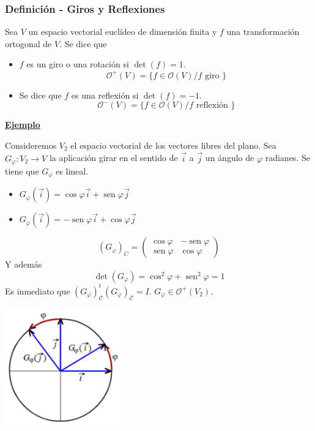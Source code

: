 \documentclass[12pt, a4paper, ones, notitlepage, openany,titlepage]{article}
\newcommand{\ejemplo}{\noindent\underline{\textbf{Ejemplo}}}
\begin{document}
\subsubsection{Definición - Giros y Reflexiones}
Sea $V$ un espacio vectorial euclídeo de dimensión finita y $f$ una transformación ortogonal de $V$. Se dice que
\begin{itemize}
	\item $f$ es un giro o una rotación si $\det(f)=1$.
	$$
	\mathcal{O}^+(V) = \{f \in \mathcal{O}(V) / f \text{ giro }\}
	$$
	\item Se dice que $f$ es una reflexión si $\det(f)=-1$.
	$$
	\mathcal{O}^-(V) = \{f \in \mathcal{O}(V) / f \text{ reflexión }\}
	$$
\end{itemize}

\ejemplo

Consideremos $V_2$ el espacio vectorial de los vectores libres del plano. Sea $G_\varphi : V_2 \to V$ la aplicación girar en el sentido de $\overrightarrow{i}$ a $\overrightarrow{j}$ un ángulo de $\varphi$ radianes. Se tiene que $G_\varphi$ es lineal.
\begin{itemize}
	\item $G_\varphi (\overrightarrow{i}) = \operatorname{cos} \varphi \overrightarrow{i} + \operatorname{sen} \varphi \overrightarrow{j}$
	\item $G_\varphi (\overrightarrow{i}) = -\operatorname{sen} \varphi \overrightarrow{i} + \operatorname{cos} \varphi \overrightarrow{j}$
\end{itemize}

$$
\left(G_{\varphi}\right)_{C}=\left(\begin{array}{rr}
	\cos \varphi & -\operatorname{sen} \varphi \\
	\operatorname{sen} \varphi & \cos \varphi
\end{array}\right)
$$
Y además
$$
\det(G_\varphi) = \operatorname{cos}^2 \varphi + \operatorname{sen}^2 \varphi = 1
$$
Es inmediato que $(G_\varphi)^t_\mathcal{C} (G_\varphi)_\mathcal{C} = I$. $G_\varphi \in \mathcal{O}^+(V_2)$.

\begin{center}
	\includegraphics[max width=5cm]{2023_03_20_c2fe6c117849a1a0e8afg-052}
\end{center}
\end{document}
